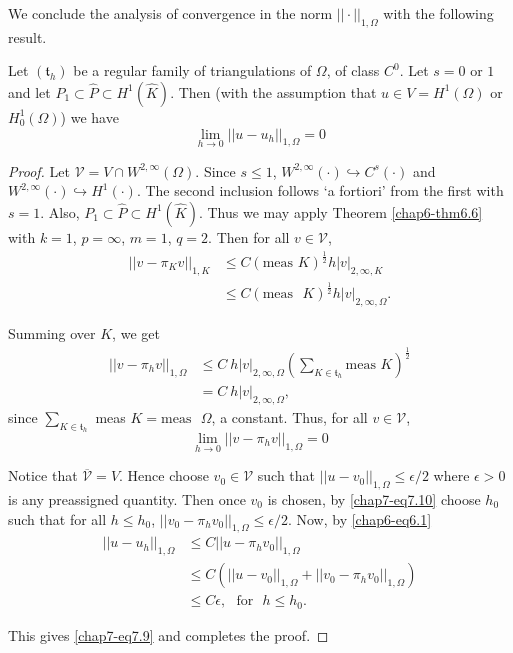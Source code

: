 We conclude the analysis of convergence in the norm
$||\cdot||_{1,\Omega}$ with the following result.

\begin{theorem}\label{chap7-thm7.2}
Let $(\mathfrak{t}_{h})$ be a regular family of triangulations of
$\Omega$, of class $C^{0}$. Let $s=0$ or $1$ and let $P_{1}\subset
\hat{P}\subset H^{1}(\hat{K})$. Then (with the assumption that $u\in
V=H^{1}(\Omega)$ or $H^{1}_{0}(\Omega)$) we have
\begin{equation*}
\lim\limits_{h\to
  0}||u-u_{h}||_{1,\Omega}=0\tag{7.9}\label{chap7-eq7.9} 
\end{equation*}
\end{theorem}

\begin{proof}
Let $\mathscr{V}=V\cap W^{2,\infty}(\Omega)$. Since $s\leq 1$,
$W^{2,\infty}(\cdot)\hookrightarrow C^{s}(\cdot)$ and
$W^{2,\infty}(\cdot)\hookrightarrow H^{1}(\cdot)$. The second
inclusion follows `a fortiori' from the first with $s=1$. Also,
$P_{1}\subset \hat{P}\subset H^{1}(\hat{K})$. Thus we may apply
Theorem \ref{chap6-thm6.6} with $k=1$, $p=\infty$, $m=1$, $q=2$. Then
for all $v\in\mathscr{V}$,
\begin{align*}
||v-\pi_{K}v||_{1,K} &\leq C(\text{meas~
}K)^{\frac{1}{2}}h|v|_{2,\infty,K}\\
&\leq C(\text{meas~ }K)^{\frac{1}{2}}h|v|_{2,\infty,\Omega}.
\end{align*}

Summing over $K$, we get
\begin{align*}
||v-\pi_{h}v||_{1,\Omega} &\leq
C\ h|v|_{2,\infty,\Omega}\left(\sum_{K\in\mathfrak{t}_{h}}\text{meas~
}K\right)^{\frac{1}{2}}\\
&= C\ h|v|_{2,\infty,\Omega}, 
\end{align*}
since $\sum_{K\in\mathfrak{t}_{h}}$ meas $K=\text{meas~ }\Omega$, a
constant. Thus, for all $v\in\mathscr{V}$, 
\begin{equation*}
\lim\limits_{h\to 0}||v-\pi_{h}v||_{1,\Omega}=0\tag{7.10}\label{chap7-eq7.10}
\end{equation*}\pageoriginale

Notice that $\overline{\mathscr{V}}=V$. Hence choose
$v_{0}\in\mathscr{V}$ such that $||u-v_{0}||_{1,\Omega}\leq
\epsilon/2$ where $\epsilon>0$ is any preassigned quantity. Then
once $v_{0}$ is chosen, by \eqref{chap7-eq7.10} choose $h_{0}$ such
that for all $h\leq h_{0}$, $||v_{0}-\pi_{h}v_{0}||_{1,\Omega}\leq
\epsilon/2$. Now, by \eqref{chap6-eq6.1}
\begin{align*}
||u-u_{h}||_{1,\Omega} &\leq C||u-\pi_{h}v_{0}||_{1,\Omega}\\
&\leq
C\left(||u-v_{0}||_{1,\Omega}+||v_{0}-\pi_{h}v_{0}||_{1,\Omega}\right)\\
&\leq C\epsilon,\text{~ for~ }h\leq h_{0}.
\end{align*}

This gives \eqref{chap7-eq7.9} and completes the proof.
\end{proof}

